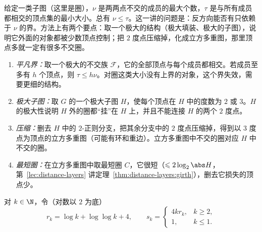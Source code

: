\label{lec:packing}

给定一类子图（这里是圈），$\nu$ 是两两点不交的成员的最大个数，$\tau$ 是与所有成员都相交的顶点集的最小大小。总有 $\nu\leqslant\tau$。这一讲的问题是：反方向能否有只依赖于 $\nu$ 的界。方法上有两个要点：取一个极大的结构（极大填装、极大的子图），说明它外面的对象都被少数顶点控制；把 $2$ 度点压缩掉，化成立方多重图，那里顶点多就一定有很多不交圈。


\begin{enumerate}
\item \emph{平凡界：}取一个极大的不交族 $\mathcal F$，它的全部顶点与每个成员都相交。若成员至多有 $h$ 个顶点，则 $\tau\leqslant h\nu$。对圈这类大小没有上界的对象，这个界失效，需要更细的结构。
\item \emph{极大子图：}取 $G$ 的一个极大子图 $H$，使每个顶点在 $H$ 中的度数为 $2$ 或 $3$。$H$ 的极大性说明 $H$ 外的圈都“挂”在 $H$ 上，并且不能连接 $H$ 的两个 $2$ 度点。
\item \emph{压缩：}删去 $H$ 中的 $2$-正则分支，把其余分支中的 $2$ 度点压缩掉，得到以 $3$ 度点为顶点的立方多重图（可能有环和重边）。立方多重图中不交的圈对应 $H$ 中不交的圈。
\item \emph{最短圈：}在立方多重图中取最短圈 $C$，它很短（$\leqslant2\log_2\abs H$，第~\ref{lec:distance-layers} 讲定理~\ref{thm:distance-layers:girth}），删去它损失的顶点少。
\end{enumerate}

对 $k\in\N$，令（对数以 $2$ 为底）
\[
r_k=\log k+\log\log k+4,\qquad s_k=\begin{cases}4kr_k,&k\geqslant2,\\1,&k\leqslant1.\end{cases}
\]

